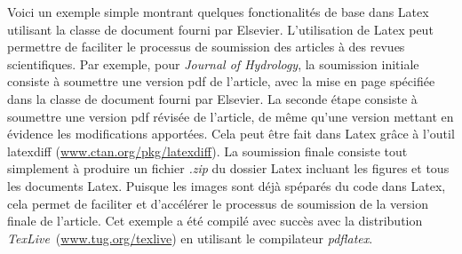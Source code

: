 \documentclass[../exemple_master.tex]{subfiles}
\begin{document}
Voici un exemple simple montrant quelques fonctionalités de base dans Latex utilisant la classe de document fourni par Elsevier. L'utilisation de Latex peut permettre de faciliter le processus de soumission des articles à des revues scientifiques. Par exemple, pour \emph{Journal of Hydrology}, la soumission initiale consiste à soumettre une version pdf de l'article, avec la mise en page spécifiée dans la classe de document fourni par Elsevier. La seconde étape consiste à soumettre une version pdf révisée de l'article, de même qu'une version mettant en évidence les modifications apportées. Cela peut être fait dans Latex grâce à l'outil latexdiff (\url{www.ctan.org/pkg/latexdiff}). La soumission finale consiste tout simplement à produire un fichier \emph{.zip} du dossier Latex incluant les figures et tous les documents Latex. Puisque les images sont déjà spéparés du code dans Latex, cela permet de faciliter et d'accélérer le processus de soumission de la version finale de l'article. Cet exemple a été compilé avec succès avec la distribution \emph{TexLive}~(\url{www.tug.org/texlive}) en utilisant le compilateur \emph{pdflatex}.
\end{document}
